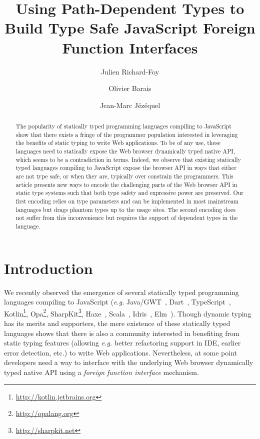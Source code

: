 \documentclass{llncs}
\begin{document}
\renewcommand{\thelstlisting}{\arabic{lstlisting}}

 \title{Using Path-Dependent Types to Build Type Safe JavaScript Foreign Function Interfaces}

 \author{Julien Richard-Foy \and Olivier Barais \and Jean-Marc J\'ez\'equel}



 \maketitle

\begin{abstract}
The popularity of statically typed programming languages compiling to JavaScript show that there exists a fringe of the programmer population interested in leveraging the benefits of static typing to write Web applications. To be of any use, these languages need to statically expose the Web browser dynamically typed native API, which seems to be a contradiction in terms. Indeed, we observe that existing statically typed languages compiling to JavaScript expose the browser API in ways that either are not type safe, or when they are, typically over constrain the programmers. This article presents new ways to encode the challenging parts of the Web browser API in static type systems such that both type safety and expressive power are preserved. Our first encoding relies on type parameters and can be implemented in most mainstream languages but drags phantom types up to the usage sites. The second encoding does not suffer from this inconvenience but requires the support of dependent types in the language.
\end{abstract}

\section{Introduction}

We recently observed the emergence of several statically typed programming languages compiling to JavaScript (\emph{e.g.} Java/GWT~\cite{Kereki09_GWT}, Dart~\cite{Griffith11_Dart}, TypeScript~\cite{fenton2012typescript}, Kotlin\footnote{\href{http://kotlin.jetbrains.org}{http://kotlin.jetbrains.org}}, Opa\footnote{\href{http://opalang.org}{http://opalang.org}}, SharpKit\footnote{\href{http://sharpkit.net}{http://sharpkit.net}}, Haxe~\cite{Cannasse08_HaXe}, Scala~\cite{Doeraene13_ScalaJs}, Idris~\cite{Brady13_Idris}, Elm~\cite{czaplicki2012elm}). Though dynamic typing has its merits and supporters, the mere existence of these statically typed languages shows that there is also a community interested in benefiting from static typing features (allowing \emph{e.g.} better refactoring support in IDE, earlier error detection, etc.) to write Web applications. Nevertheless, at some point developers need a way to interface with the underlying Web browser dynamically typed native API using a \emph{foreign function interface} mechanism.
\end{document}
